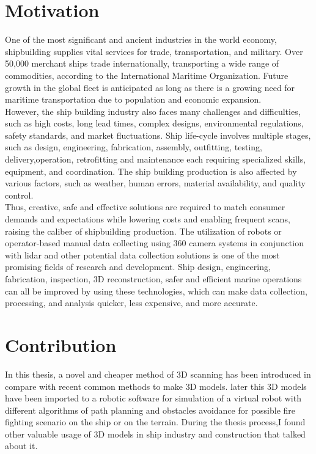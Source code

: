 



\section{Motivation}

One of the most significant and ancient industries in the world economy, shipbuilding supplies vital services for trade, transportation, and military. Over 50,000 merchant ships trade internationally, transporting a wide range of commodities, according to the International Maritime Organization. Future growth in the global fleet is anticipated as long as there is a growing need for maritime transportation due to population and economic expansion.\\

\noindent However, the ship building industry also faces many challenges and difficulties, such as high costs, long lead times, complex designs, environmental regulations, safety standards, and market fluctuations. Ship life-cycle involves multiple stages, such as design, engineering, fabrication, assembly, outfitting, testing, delivery,operation, retrofitting and maintenance each requiring specialized skills, equipment, and coordination. The ship building production is also affected by various factors, such as weather, human errors, material availability, and quality control. \\


\noindent Thus, creative, safe and effective solutions are required to match consumer demands and expectations while lowering costs and enabling frequent scans, raising the caliber of shipbuilding production. The utilization of robots or operator-based manual data collecting using 360 camera systems in conjunction with lidar and other potential data collection solutions is one of the most promising fields of research and development. Ship design, engineering, fabrication, inspection, 3D reconstruction, safer and efficient marine operations can all be improved by using these technologies, which can make data collection, processing, and analysis quicker, less expensive, and more accurate.\\

\section{Contribution}
\noindent In this thesis, a novel and cheaper method of 3D scanning has been introduced in compare with recent common methods to make 3D models. later this 3D models have been imported to a robotic software for simulation of a virtual robot with different algorithms of path planning and obstacles avoidance for possible fire fighting scenario on the ship or on the terrain. During the thesis process,I found other valuable usage of 3D models in ship industry and construction that talked about it.\\     

